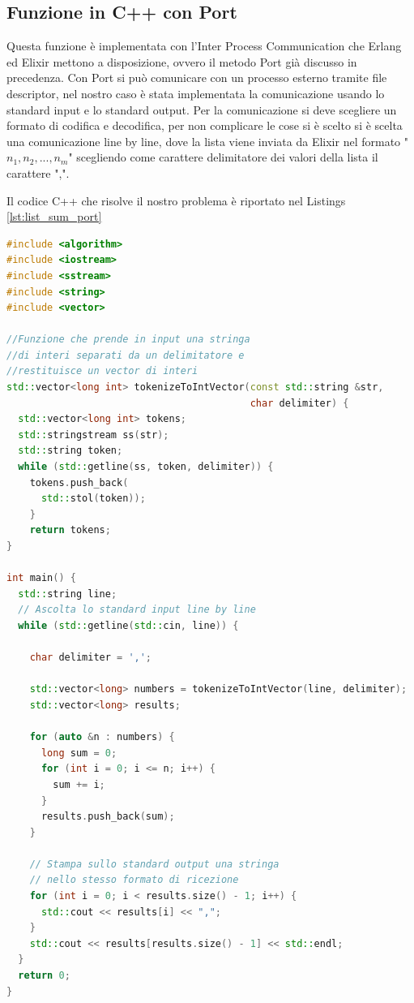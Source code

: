 
\subsection{Funzione in C++ con Port}\label{subsec:port_cpp}

Questa funzione è implementata con l'Inter Process Communication
che Erlang ed Elixir mettono a disposizione, ovvero il metodo Port
già discusso in precedenza.
Con Port si può comunicare con un processo esterno tramite
file descriptor, nel nostro caso è stata implementata la
comunicazione usando lo standard input e lo standard output. 
Per la comunicazione si deve scegliere un formato di codifica e decodifica, per non complicare le cose si è scelto
si è scelta una comunicazione line by line, dove la lista viene inviata
da Elixir nel formato "$n_{1},n_{2},...,n_{m}$" scegliendo come
carattere delimitatore dei valori della lista il carattere ",".

Il codice C++ che risolve il nostro problema è riportato nel Listings
\ref{lst:list_sum_port}

\begin{lstlisting}[language=cpp,captionpos=b,
	caption={Funzione list\_sum\_port()},
	label={lst:list_sum_port}]
#include <algorithm>
#include <iostream>
#include <sstream>
#include <string>
#include <vector>
	
//Funzione che prende in input una stringa
//di interi separati da un delimitatore e
//restituisce un vector di interi
std::vector<long int> tokenizeToIntVector(const std::string &str,
                                          char delimiter) {
  std::vector<long int> tokens;
  std::stringstream ss(str);
  std::string token;
  while (std::getline(ss, token, delimiter)) {
    tokens.push_back(
      std::stol(token));
	}
	return tokens;
}
	
int main() {
  std::string line;
  // Ascolta lo standard input line by line
  while (std::getline(std::cin, line)) {

    char delimiter = ',';

    std::vector<long> numbers = tokenizeToIntVector(line, delimiter);
    std::vector<long> results;

    for (auto &n : numbers) {
      long sum = 0;
      for (int i = 0; i <= n; i++) {
        sum += i;
      }
      results.push_back(sum);
    }

    // Stampa sullo standard output una stringa
    // nello stesso formato di ricezione
    for (int i = 0; i < results.size() - 1; i++) {
      std::cout << results[i] << ",";
    }
    std::cout << results[results.size() - 1] << std::endl;
  }
  return 0;
}

\end{lstlisting}

